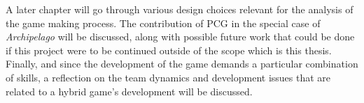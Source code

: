 A later chapter will go through various design choices relevant for the analysis of the game making process. The contribution of PCG in the special case of \textit{Archipelago} will be discussed, along with possible future work that could be done if this project were to be continued outside of the scope which is this thesis. Finally, and since the development of the game demands a particular combination of skills, a reflection on the team dynamics and development issues that are related to a hybrid game's development will be discussed.